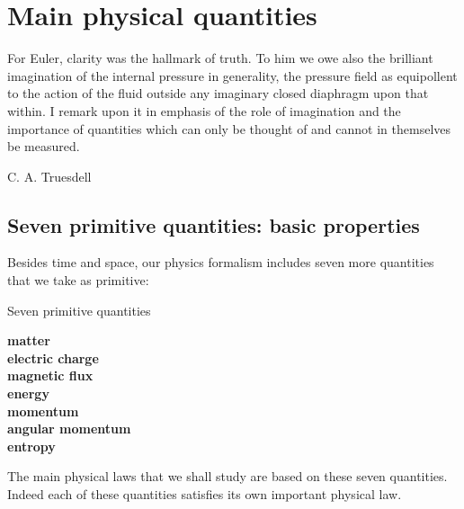 \documentclass[a4paper,12pt,%
onecolumn,oneside,%
british%
]{memoir}
\renewcommand*{\|}[1][]{\nonscript\:#1\vert\nonscript\:\mathopen{}}
\begin{document}
%
%
%
%





\printpagenotes*
\clearpage
\chapter{Main physical quantities}
\label{cha:stuff}

\epigraph{For Euler, clarity was the hallmark of truth. \textelp{} To him we owe also the brilliant imagination of the internal pressure in generality, the pressure field as equipollent to the action of the fluid outside any imaginary closed diaphragm upon that within. \textelp{} I remark upon it in emphasis of the role of imagination and the importance of quantities which can only be thought of and cannot in themselves be measured.}{C. A. Truesdell \cites*{truesdell1956d}}



\section[Seven primitive quantities]{Seven primitive quantities: basic properties}
\label{sec:stuff}

Besides time and space, our physics formalism includes seven more quantities that we take as primitive:
\begin{definition}{Seven primitive quantities}
  \begin{center}\bfseries
    matter
    \\ electric charge
    \\ magnetic flux
    \\ energy
    \\ momentum
    \\ angular momentum
    \\ entropy
  \end{center}
\end{definition}
The main physical laws that we shall study are based on these seven quantities. Indeed each of these quantities satisfies its own important physical law.
\end{document}
